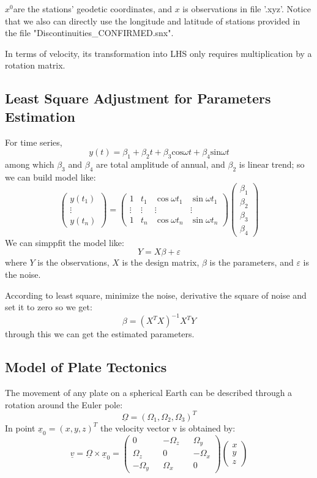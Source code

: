 \documentclass{article}
\begin{document}
$x^0$are the stations' geodetic coordinates, and $x$ is observations in file '.xyz'.
Notice that we also can directly use the longitude and latitude of stations provided in the file "Discontinuities\_CONFIRMED.snx".

In terms of velocity, its transformation into LHS only requires multiplication by a rotation matrix.
\subsection{Least Square Adjustment for Parameters Estimation}
For time series, $$ y(t)=\beta_{1}+\beta_{2}t+\beta_{3}\mathrm{cos}\omega t+\beta_{4}\mathrm{sin}\omega t $$
among which $\beta_3$ and $\beta_4$ are total amplitude of annual, and $\beta_2$ is linear trend; so we can build model like:
$$\begin{pmatrix}y(t_1)\\\vdots\\y(t_n)\end{pmatrix}=\begin{pmatrix}1&t_1&\cos\omega t_1&\sin\omega t_1\\\vdots&\vdots&\vdots&\vdots\\1&t_n&\cos\omega t_n&\sin\omega t_n\end{pmatrix}\begin{pmatrix}\beta_1\\\beta_2\\\beta_3\\\beta_4\end{pmatrix}$$
We can simppfit the model like: $$Y=X\beta+\varepsilon$$
where $Y$ is the observations, $X$ is the design matrix, $\beta$ is the parameters, and $\varepsilon$ is the noise.

According to least square, minimize the noise, 
derivative the square of noise and set it to zero so we get:
$$\beta=(X^TX)^{-1}X^TY$$ through this we can get the estimated parameters.

\subsection{Model of Plate Tectonics}
The movement of any plate on a spherical Earth can be described through a rotation around the Euler pole:
$$\underline{\Omega}=(\Omega_{1},\Omega_{2},\Omega_{3})^{T}$$
In point $\underline{x}_{0}=(x,y,z)^{T}$ the velocity vector v is obtained by:
$$\underline{v}=\underline{\Omega}\times\underline{x}_0=\begin{pmatrix}0&&-\Omega_z&&\Omega_y\\\Omega_z&&0&&-\Omega_x\\-\Omega_y&&\Omega_x&&0\end{pmatrix}\begin{pmatrix}x\\y\\z\end{pmatrix}$$
\end{document}
